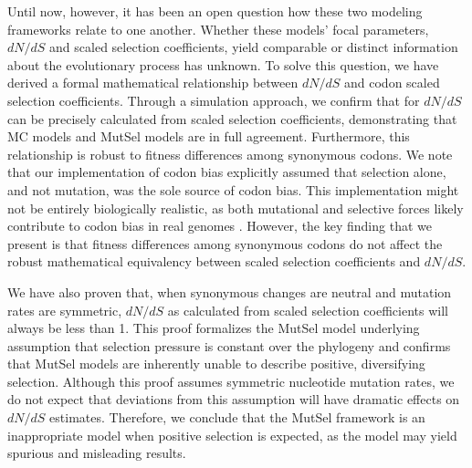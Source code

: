 \documentclass{pnastwo}
\begin{document}
\begin{article}
Until now, however, it has been an open question how these two modeling frameworks relate to one another. Whether these models' focal parameters, $dN/dS$ and scaled selection coefficients, yield comparable or distinct information about the evolutionary process has unknown. To solve this question, we have derived a formal mathematical relationship between $dN/dS$ and codon scaled selection coefficients. Through a simulation approach, we confirm that for $dN/dS$ can be precisely calculated from scaled selection coefficients, demonstrating that MC models and MutSel models are in full agreement. Furthermore, this relationship is robust to fitness differences among synonymous codons. We note that our implementation of codon bias explicitly assumed that selection alone, and not mutation, was the sole source of codon bias. This implementation might not be entirely biologically realistic, as both mutational and selective forces likely contribute to codon bias in real genomes \cite{Blumer1991, Duret2002, HershbergPetrov2008, Chen2009, PlotkinKudla2010}. However, the key finding that we present is that fitness differences among synonymous codons do not affect the robust mathematical equivalency between scaled selection coefficients and $dN/dS$. 

We have also proven that, when synonymous changes are neutral and mutation rates are symmetric, $dN/dS$ as calculated from scaled selection coefficients will always be less than 1. This proof formalizes the MutSel model underlying assumption that selection pressure is constant over the phylogeny and confirms that MutSel models are inherently unable to describe positive, diversifying selection. Although this proof assumes symmetric nucleotide mutation rates, we do not expect that deviations from this assumption will have dramatic effects on $dN/dS$ estimates. Therefore, we conclude that the MutSel framework is an inappropriate model when positive selection is expected, as the model may yield spurious and misleading results. 


\end{article}
\end{document}
